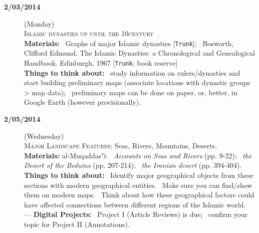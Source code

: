\documentclass{tufte-handout} %
\newcommand{\Trunk}{\texttt{Trunk}}
\begin{document}
\begin{description}
\noindent\hrulefill

\item[\textbf{2/03/2014}] (Monday)\\
\textsc{Islamic dynasties up until the 10\thh century~\CE}.\\
\textbf{Materials:}	\textbullet~Graphs of major Islamic dynasties [\Trunk];
\textbullet~Bosworth, Clifford Edmund. The Islamic Dynasties: a Chronological and Genealogical Handbook. Edinburgh, 1967 [\Trunk; book reserve]\\
\textbf{Things to think about:} \textbullet~study information on rulers/dynasties and start building preliminary maps (associate locations with dynastic groups > map data); \textbullet~preliminary maps can be done on paper, or, better, in Google Earth (however provisionally).

\item[\textbf{2/05/2014}] (Wednesday)\\
\textsc{Major Landscape Features}: Seas, Rivers, Mountains, Deserts.\\
\textbf{Materials:} al-Muqaddas"i: \textbullet~\textit{Accounts on Seas and Rivers} (pp. 9-22); \textbullet~\textit{the Desert of the Beduins} (pp. 207-214); \textbullet~\textit{the Iranian desert} (pp. 394-404).
\textbf{Things to think about:} \textbullet~Identify major geographical objects from these sections with modern geographical entities. \textbullet~Make sure you can find/show them on modern maps. \textbullet~Think about how these geographical factors could have affected connections between different regions of the Islamic world.\\
---
\textbf{Digital Projects:} \textbullet~Project I (Article Reviews) is due; \textbullet~confirm your topic for Project II (Annotations).


\noindent\hrulefill


\end{description}
\end{document}
